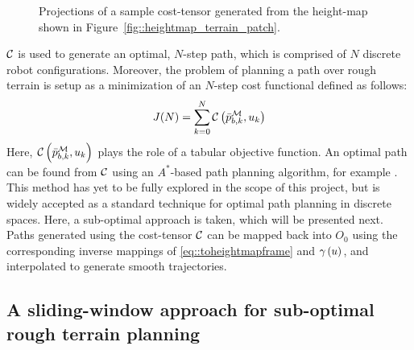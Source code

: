 				\begin{figure}
					\centering
					\caption{Projections of a sample cost-tensor generated from the height-map shown in Figure~\ref{fig::heightmap_terrain_patch}.}
					\label{fig::cost_map}
				\end{figure}

			${\cal C}$ is used to generate an optimal, $N$-step path, which is comprised of $N$ discrete robot configurations. Moreover, the problem of planning a path over rough terrain is setup as a minimization of an $N$-step cost functional defined as follows:
				\begin{equation}			
					J(N) = \sum_{k=0}^N {\cal C}\left(\bar{p}^{{\cal M}}_{b,k},u_{k}\right)
				\end{equation}
			Here, ${\cal C}\left(\bar{p}^{{\cal M}}_{b,k},u_{k}\right)$ plays the role of a tabular objective function. An optimal path can be found from ${\cal C}$ using an $A^{*}$-based path planning algorithm, for example \cite{Hart1968}. This method has yet to be fully explored in the scope of this project, but is widely accepted as a standard technique for optimal path planning in discrete spaces. Here, a sub-optimal approach is taken, which will be presented next.  Paths generated using the cost-tensor ${\cal C}$ can be mapped back into $O_{0}$ using the corresponding inverse mappings of \ref{eq::toheightmapframe} and $\gamma\left(u\right)$, and interpolated to generate smooth trajectories.
			






		\subsection{A sliding-window approach for sub-optimal rough terrain planning}

